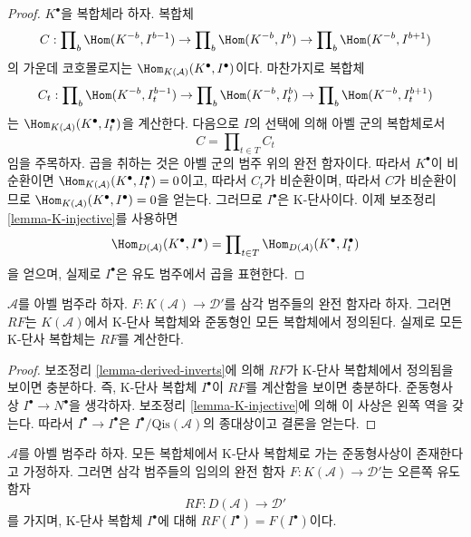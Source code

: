 \begin{proof}
$K^\bullet$을 복합체라 하자. 복합체
$$
C :
\prod\nolimits_b \Hom(K^{-b}, I^{b - 1}) \to
\prod\nolimits_b \Hom(K^{-b}, I^b) \to
\prod\nolimits_b \Hom(K^{-b}, I^{b + 1})
$$
의 가운데 코호몰로지는
$\Hom_{K(\mathcal{A})}(K^\bullet, I^\bullet)$이다. 마찬가지로 복합체
$$
C_t :
\prod\nolimits_b \Hom(K^{-b}, I_t^{b - 1}) \to
\prod\nolimits_b \Hom(K^{-b}, I_t^b) \to
\prod\nolimits_b \Hom(K^{-b}, I_t^{b + 1})
$$
는 $\Hom_{K(\mathcal{A})}(K^\bullet, I_t^\bullet)$을 계산한다.
다음으로 $I$의 선택에 의해 아벨 군의 복합체로서
$$
C = \prod\nolimits_{t \in T} C_t
$$
임을 주목하자. 곱을 취하는 것은 아벨 군의 범주 위의 완전 함자이다.
따라서 $K^\bullet$이 비순환이면
$\Hom_{K(\mathcal{A})}(K^\bullet, I_t^\bullet) = 0$이고,
따라서 $C_t$가 비순환이며, 따라서 $C$가 비순환이므로
$\Hom_{K(\mathcal{A})}(K^\bullet, I^\bullet) = 0$을 얻는다.
그러므로 $I^\bullet$은 K-단사이다. 이제 보조정리
\ref{lemma-K-injective}를 사용하면
$$
\Hom_{D(\mathcal{A})}(K^\bullet, I^\bullet)
=
\prod\nolimits_{t \in T} \Hom_{D(\mathcal{A})}(K^\bullet, I_t^\bullet)
$$
을 얻으며, 실제로 $I^\bullet$은 유도 범주에서 곱을 표현한다.
\end{proof}

\begin{lemma}
\label{lemma-K-injective-defined}
$\mathcal{A}$를 아벨 범주라 하자.
$F : K(\mathcal{A}) \to \mathcal{D}'$를 삼각 범주들의 완전 함자라 하자.
그러면 $RF$는 $K(\mathcal{A})$에서 K-단사 복합체와 준동형인 모든
복합체에서 정의된다. 실제로 모든 K-단사 복합체는 $RF$를 계산한다.
\end{lemma}

\begin{proof}
보조정리 \ref{lemma-derived-inverts}에 의해 $RF$가 K-단사 복합체에서
정의됨을 보이면 충분하다. 즉, K-단사 복합체 $I^\bullet$이 $RF$를
계산함을 보이면 충분하다. 준동형사상
$I^\bullet \to N^\bullet$을 생각하자. 보조정리
\ref{lemma-K-injective}에 의해 이 사상은 왼쪽 역을 갖는다.
따라서 $I^\bullet \to I^\bullet$은
$I^\bullet/\text{Qis}(\mathcal{A})$의 종대상이고 결론을 얻는다.
\end{proof}

\begin{lemma}
\label{lemma-enough-K-injectives-implies}
$\mathcal{A}$를 아벨 범주라 하자. 모든 복합체에서 K-단사 복합체로
가는 준동형사상이 존재한다고 가정하자. 그러면 삼각 범주들의 임의의
완전 함자 $F : K(\mathcal{A}) \to \mathcal{D}'$는 오른쪽 유도 함자
$$
RF : D(\mathcal{A}) \longrightarrow \mathcal{D}'
$$
를 가지며, K-단사 복합체 $I^\bullet$에 대해
$RF(I^\bullet) = F(I^\bullet)$이다.
\end{lemma}

